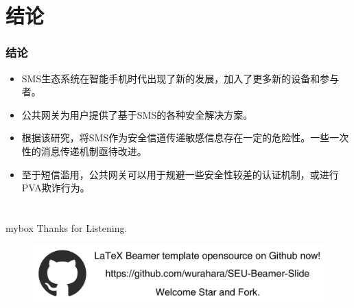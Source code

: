 \documentclass[10pt,aspectratio=43,mathserif]{beamer}
\begin{document}
\begin{frame}
\begin{columns}
            \end{columns}
            
		\end{frame}

\section[结论]{结论}


		\begin{frame}
		  \frametitle{\textbf{结论}}
		
		  \begin{itemize}
		    \item SMS生态系统在智能手机时代出现了新的发展，加入了更多新的设备和参与者。
		    \item 公共网关为用户提供了基于SMS的各种安全解决方案。
            \item 根据该研究，将SMS作为安全信道传递敏感信息存在一定的危险性。一些一次性的消息传递机制亟待改进。
            \item 至于短信滥用，公共网关可以用于规避一些安全性较差的认证机制，或进行PVA欺诈行为。
		  \end{itemize}
		\end{frame}


\section*{}
            \begin{frame}

                \begin{center}
                    \begin{minipage}{1\textwidth}
                        \begin{beamercolorbox}[wd=0.70\textwidth, rounded=true, shadow=true]{mybox}
                        \LARGE \centering Thanks for Listening.
                        \end{beamercolorbox}
                    \end{minipage}
                \end{center}
                
                \begin{figure}[!t]
                    \centering
                    \includegraphics[width=.8\textwidth]{figures/figure5.png}
                    \label{figure4_ad}
                \end{figure}
            \end{frame}
\end{document}
